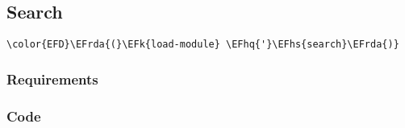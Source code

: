 \documentclass[a4wide,10pt]{article}
\newcommand{\EFk}[1]{\textcolor{EFk}{#1}} %
\newcommand{\EFhq}[1]{\textcolor{EFhq}{#1}} %
\newcommand{\EFhs}[1]{\textcolor{EFhs}{#1}} %
\newcommand{\EFrda}[1]{\textcolor{EFrda}{#1}} %
\begin{document}
\subsection{Search}
\label{sec:org7380182}
\begin{Code}
\begin{Verbatim}
\color{EFD}\EFrda{(}\EFk{load-module} \EFhq{'}\EFhs{search}\EFrda{)}
\end{Verbatim}
\end{Code}
\subsubsection{Requirements}
\label{sec:org3d2de02}
\subsubsection{Code}
\label{sec:orgd8dd4bc}
\end{document}
